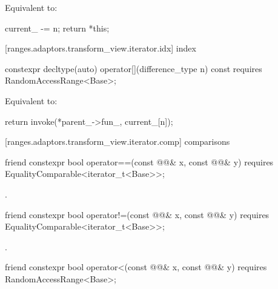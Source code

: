 \begin{itemdescr}
\pnum
\effects Equivalent to:
\begin{codeblock}
current_ -= n;
return *this;
\end{codeblock}
\end{itemdescr}

[ranges.adaptors.transform_view.iterator.idx]{ index}

\begin{itemdecl}
constexpr decltype(auto) operator[](difference_type n) const
  requires RandomAccessRange<Base>;
\end{itemdecl}

\begin{itemdescr}
\pnum
\effects Equivalent to:
\begin{codeblock}
return invoke(*parent_->fun_, current_[n]);
\end{codeblock}
\end{itemdescr}

[ranges.adaptors.transform_view.iterator.comp]{ comparisons}

\begin{itemdecl}
friend constexpr bool operator==(const @@& x, const @@& y)
  requires EqualityComparable<iterator_t<Base>>;
\end{itemdecl}

\begin{itemdescr}
\pnum
\returns {}.
\end{itemdescr}

%
\begin{itemdecl}
friend constexpr bool operator!=(const @@& x, const @@& y)
  requires EqualityComparable<iterator_t<Base>>;
\end{itemdecl}

\begin{itemdescr}
\pnum
\returns {}.
\end{itemdescr}

%
\begin{itemdecl}
friend constexpr bool operator<(const @@& x, const @@& y)
  requires RandomAccessRange<Base>;
\end{itemdecl}

